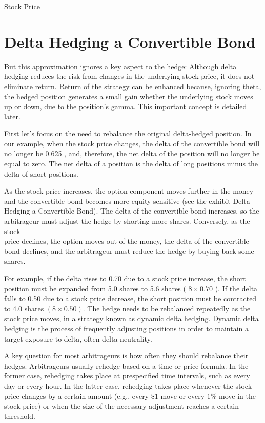 \documentclass[11pt]{article}
\begin{document}
Stock Price

\section*{Delta Hedging a Convertible Bond}
But this approximation ignores a key aspect to the hedge: Although delta hedging reduces the risk from changes in the underlying stock price, it does not eliminate return. Return of the strategy can be enhanced because, ignoring theta, the hedged position generates a small gain whether the underlying stock moves up or down, due to the position's gamma. This important concept is detailed later.

First let's focus on the need to rebalance the original delta-hedged position. In our example, when the stock price changes, the delta of the convertible bond will no longer be 0.625 , and, therefore, the net delta of the position will no longer be equal to zero. The net delta of a position is the delta of long positions minus the delta of short positions.

As the stock price increases, the option component moves further in-the-money and the convertible bond becomes more equity sensitive (see the exhibit Delta Hedging a Convertible Bond). The delta of the convertible bond increases, so the arbitrageur must adjust the hedge by shorting more shares. Conversely, as the stock\\
price declines, the option moves out-of-the-money, the delta of the convertible bond declines, and the arbitrageur must reduce the hedge by buying back some shares.

For example, if the delta rises to 0.70 due to a stock price increase, the short position must be expanded from 5.0 shares to 5.6 shares ( $8 \times 0.70$ ). If the delta falls to 0.50 due to a stock price decrease, the short position must be contracted to 4.0 shares $(8 \times 0.50)$. The hedge needs to be rebalanced repeatedly as the stock price moves, in a strategy known as dynamic delta hedging. Dynamic delta hedging is the process of frequently adjusting positions in order to maintain a target exposure to delta, often delta neutrality.

A key question for most arbitrageurs is how often they should rebalance their hedges. Arbitrageurs usually rehedge based on a time or price formula. In the former case, rehedging takes place at prespecified time intervals, such as every day or every hour. In the latter case, rehedging takes place whenever the stock price changes by a certain amount (e.g., every $\$ 1$ move or every $1 \%$ move in the stock price) or when the size of the necessary adjustment reaches a certain threshold.
\end{document}
